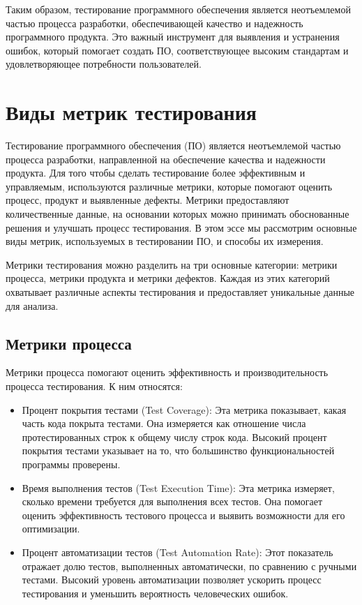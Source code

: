     Таким образом, тестирование программного обеспечения является неотъемлемой частью процесса разработки, обеспечивающей качество и надежность программного продукта. Это важный инструмент для выявления и устранения ошибок, который помогает создать ПО, соответствующее высоким стандартам и удовлетворяющее потребности пользователей.

    \section{Виды метрик тестирования}
    Тестирование программного обеспечения (ПО) является неотъемлемой частью процесса разработки, направленной на обеспечение качества и надежности продукта. Для того чтобы сделать тестирование более эффективным и управляемым, используются различные метрики, которые помогают оценить процесс, продукт и выявленные дефекты. Метрики предоставляют количественные данные, на основании которых можно принимать обоснованные решения и улучшать процесс тестирования. В этом эссе мы рассмотрим основные виды метрик, используемых в тестировании ПО, и способы их измерения.

    Метрики тестирования можно разделить на три основные категории: метрики процесса, метрики продукта и метрики дефектов. Каждая из этих категорий охватывает различные аспекты тестирования и предоставляет уникальные данные для анализа. 	

    \subsection {Метрики процесса}
    Метрики процесса помогают оценить эффективность и производительность процесса тестирования. К ним относятся:
    \begin{itemize}
        \item Процент покрытия тестами (Test Coverage): Эта метрика показывает, какая часть кода покрыта тестами. Она измеряется как отношение числа протестированных строк к общему числу строк кода. Высокий процент покрытия тестами указывает на то, что большинство функциональностей программы проверены.
        \item Время выполнения тестов (Test Execution Time): Эта метрика измеряет, сколько времени требуется для выполнения всех тестов. Она помогает оценить эффективность тестового процесса и выявить возможности для его оптимизации.
        \item Процент автоматизации тестов (Test Automation Rate): Этот показатель отражает долю тестов, выполненных автоматически, по сравнению с ручными тестами. Высокий уровень автоматизации позволяет ускорить процесс тестирования и уменьшить вероятность человеческих ошибок.
    \end{itemize}

